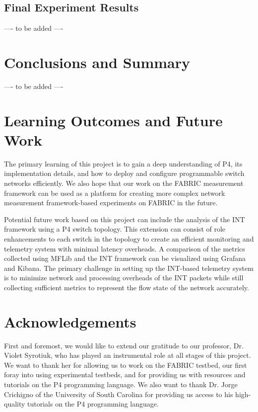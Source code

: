 \documentclass[conference]{IEEEtran}
\begin{document}
    \subsection{Final Experiment Results}
    ---- to be added ----

    \section{Conclusions and Summary}
    ---- to be added ----

    \section{Learning Outcomes and Future Work}
    The primary learning of this project is to gain a deep understanding of P4, its implementation details, and how to deploy and configure programmable switch networks efficiently. We also hope that our work on the FABRIC measurement framework can be used as a platform for creating more complex network measurement framework-based experiments on FABRIC in the future.

    Potential future work based on this project can include the analysis of the INT framework using a P4 switch topology. This extension can consist of role enhancements to each switch in the topology to create an efficient monitoring and telemetry system with minimal latency overheads. A comparison of the metrics collected using MFLib and the INT framework can be visualized using Grafana and Kibana. The primary challenge in setting up the INT-based telemetry system is to minimize network and processing overheads of the INT packets while still collecting sufficient metrics to represent the flow state of the network accurately.

    \section{Acknowledgements}
    First and foremost, we would like to extend our gratitude to our professor, Dr. Violet Syrotiuk, who has played an instrumental role at all stages of this project. We want to thank her for allowing us to work on the FABRIC testbed, our first foray into using experimental testbeds, and for providing us with resources and tutorials on the P4 programming language. We also want to thank Dr. Jorge Crichigno of the University of South Carolina for providing us access to his high-quality tutorials on the P4 programming language.
\end{document}
